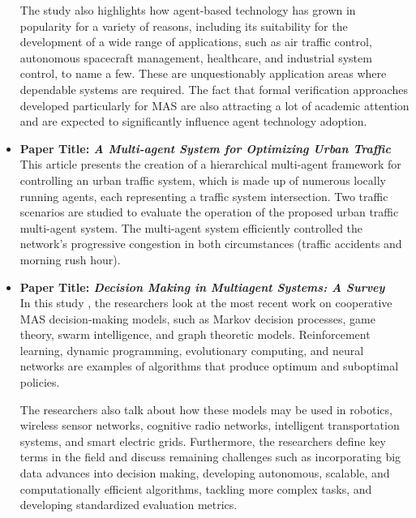 \begin{itemize}[label={}]
\vspace{.5cm}

The study also highlights how agent-based technology has grown in popularity for a variety of reasons, including its suitability for the development of a wide range of applications, such as air traffic control, autonomous spacecraft management, healthcare, and industrial system control, to name a few. These are unquestionably application areas where dependable systems are required. The fact that formal verification approaches developed particularly for \ac{MAS} are also attracting a lot of academic attention and are expected to significantly influence agent technology adoption.

\vspace{.5cm}

\item \textbf{Paper Title: \textit{A Multi-agent System for Optimizing Urban Traffic}}\\

This article \cite{traffmulti} presents the creation of a hierarchical multi-agent framework for controlling an urban traffic system, which is made up of numerous locally running agents, each representing a traffic system intersection. Two traffic scenarios are studied to evaluate the operation of the proposed urban traffic multi-agent system. The multi-agent system efficiently controlled the network's progressive congestion in both circumstances (traffic accidents and morning rush hour).

\vspace{.5cm}

\item \textbf{Paper Title: \textit{Decision Making in Multiagent Systems: A Survey}} \\

In this study \cite{decision}, the researchers look at the most recent work on cooperative MAS decision-making models, such as Markov decision processes, game theory, swarm intelligence, and graph theoretic models. Reinforcement learning, dynamic programming, evolutionary computing, and neural networks are examples of algorithms that produce optimum and suboptimal policies.

\vspace{.5cm}

The researchers also talk about how these models may be used in robotics, wireless sensor networks, cognitive radio networks, intelligent transportation systems, and smart electric grids. Furthermore, the researchers define key terms in the field and discuss remaining challenges such as incorporating big data advances into decision making, developing autonomous, scalable, and computationally efficient algorithms, tackling more complex tasks, and developing standardized evaluation metrics.


\end{itemize}
